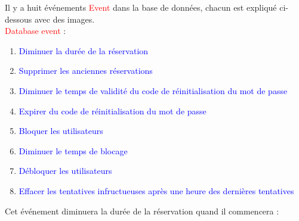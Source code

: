 \documentclass{article}
\begin{document}
\begin{enumerate}
\begin{enumerate}
\begin{enumerate}
            \setlength{\parindent}{1cm} Il y a huit événements \textcolor{red}{Event} dans la base de données, chacun est expliqué ci-dessous avec des images.\\
	\textcolor{red}{Database event} :  
	
	\begin{enumerate}
	\item \textcolor{blue}{Diminuer la durée de la réservation}
	\item \textcolor{blue}{Supprimer les anciennes réservations}
	\item \textcolor{blue}{Diminuer le temps de validité du code de réinitialisation du mot de passe}
	\item \textcolor{blue}{Expirer du code de réinitialisation du mot de passe}
	\item \textcolor{blue}{Bloquer les utilisateurs}
	\item \textcolor{blue}{Diminuer le temps de blocage}
	\item \textcolor{blue}{Débloquer les utilisateurs}
	\item \textcolor{blue}{Effacer les tentatives infructueuses après une heure des dernières tentatives}

	\end{enumerate}
	
	\vspace{2cm}
	
	
	Cet événement diminuera la durée de la réservation quand il commencera :      
         
         \hspace*{-1.05in}
               \noindent{}
         

\end{enumerate}
\end{enumerate}
\end{enumerate}
\end{document}
